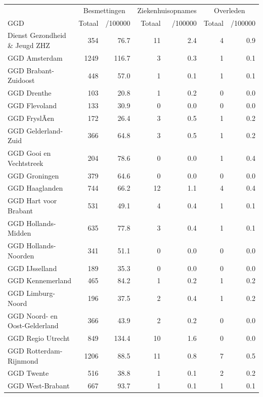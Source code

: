 \documentclass[
  english,
  man,floatsintext]{apa6}
\begin{document}
\begin{table}
\centering\begingroup\fontsize{10}{12}\selectfont

\begin{threeparttable}
\begin{tabular}{lrrrrrr}
\toprule
\multicolumn{1}{c}{ } & \multicolumn{2}{c}{Besmettingen} & \multicolumn{2}{c}{Ziekenhuisopnames} & \multicolumn{2}{c}{Overleden} \\
\cmidrule(l{3pt}r{3pt}){2-3} \cmidrule(l{3pt}r{3pt}){4-5} \cmidrule(l{3pt}r{3pt}){6-7}
GGD & Totaal & /100000 & Totaal & /100000 & Totaal & /100000\\
\midrule
Dienst Gezondheid \& Jeugd ZHZ & 354 & 76.7 & 11 & 2.4 & 4 & 0.9\\
GGD Amsterdam & 1249 & 116.7 & 3 & 0.3 & 1 & 0.1\\
GGD Brabant-Zuidoost & 448 & 57.0 & 1 & 0.1 & 1 & 0.1\\
GGD Drenthe & 103 & 20.8 & 1 & 0.2 & 0 & 0.0\\
GGD Flevoland & 133 & 30.9 & 0 & 0.0 & 0 & 0.0\\
GGD FryslÃ¢n & 172 & 26.4 & 3 & 0.5 & 1 & 0.2\\
GGD Gelderland-Zuid & 366 & 64.8 & 3 & 0.5 & 1 & 0.2\\
GGD Gooi en Vechtstreek & 204 & 78.6 & 0 & 0.0 & 1 & 0.4\\
GGD Groningen & 379 & 64.6 & 0 & 0.0 & 0 & 0.0\\
GGD Haaglanden & 744 & 66.2 & 12 & 1.1 & 4 & 0.4\\
GGD Hart voor Brabant & 531 & 49.1 & 4 & 0.4 & 1 & 0.1\\
GGD Hollands-Midden & 635 & 77.8 & 3 & 0.4 & 1 & 0.1\\
GGD Hollands-Noorden & 341 & 51.1 & 0 & 0.0 & 0 & 0.0\\
GGD IJsselland & 189 & 35.3 & 0 & 0.0 & 0 & 0.0\\
GGD Kennemerland & 465 & 84.2 & 1 & 0.2 & 1 & 0.2\\
GGD Limburg-Noord & 196 & 37.5 & 2 & 0.4 & 1 & 0.2\\
GGD Noord- en Oost-Gelderland & 366 & 43.9 & 2 & 0.2 & 0 & 0.0\\
GGD Regio Utrecht & 849 & 134.4 & 10 & 1.6 & 0 & 0.0\\
GGD Rotterdam-Rijnmond & 1206 & 88.5 & 11 & 0.8 & 7 & 0.5\\
GGD Twente & 516 & 38.8 & 1 & 0.1 & 2 & 0.2\\
GGD West-Brabant & 667 & 93.7 & 1 & 0.1 & 1 & 0.1\\

\end{tabular}
\end{threeparttable}
\end{table}
\end{document}
